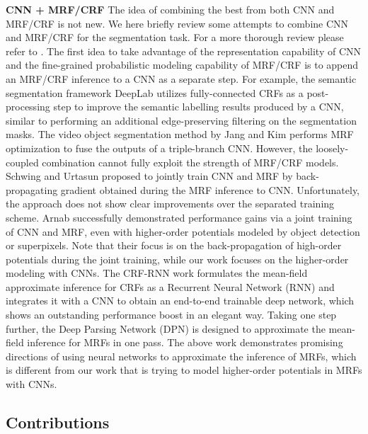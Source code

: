 \documentclass[10pt,twocolumn,letterpaper]{article}
\begin{document}
\noindent\textbf{CNN + MRF/CRF} The idea of combining the best from both CNN and MRF/CRF is not new.
We here briefly review some attempts to combine CNN and MRF/CRF for the segmentation task. For a more thorough review please refer to \cite{arnabconditional2018review}.
The first idea to take advantage of the representation capability of CNN and the fine-grained probabilistic modeling capability of MRF/CRF
is to append an MRF/CRF inference to a CNN as a separate step. For example, the semantic segmentation framework DeepLab \cite{chen2017deeplabpami}
utilizes fully-connected CRFs \cite{krahenbuhl2011efficient} as a post-processing step to improve the semantic labelling results produced by a CNN,
similar to performing an additional edge-preserving filtering \cite{gastal2011domain,bao2014tree,bao2012icprdehaze,bao2014robust} on the segmentation masks.
The video object segmentation method by Jang and Kim \cite{jang2017online} performs MRF optimization to fuse the outputs of a triple-branch CNN.
However, the loosely-coupled combination cannot fully exploit the strength of MRF/CRF models. Schwing and Urtasun \cite{schwing2015fully}
proposed to jointly train CNN and MRF by back-propagating gradient obtained during the MRF inference to CNN. Unfortunately, the approach
does not show clear improvements over the separated training scheme.
Arnab \etal \cite{arnab2016higher} successfully demonstrated performance gains via a joint training of CNN and MRF, even with higher-order
potentials modeled by object detection or superpixels. Note that their focus is on the back-propagation of high-order potentials during the joint training,
while our work focuses on the higher-order modeling with CNNs.
The CRF-RNN work \cite{zheng2015conditional} formulates the mean-field approximate inference for CRFs as a Recurrent Neural Network (RNN)
and integrates it with a CNN to obtain an end-to-end trainable deep network, which shows an outstanding performance boost in an elegant way.
Taking one step further, the Deep Parsing Network (DPN) \cite{liu2017deep} is designed to approximate the mean-field inference for MRFs in one pass.
The above work demonstrates promising directions of using neural networks to approximate the inference of MRFs,
which is different from our work that is trying to model higher-order potentials in MRFs with CNNs.




\subsection{Contributions}
\end{document}
